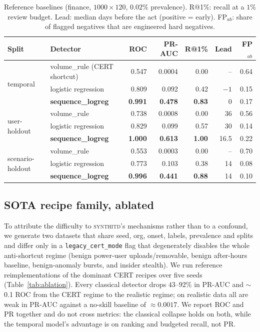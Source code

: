 \documentclass[11pt]{article}
\newcommand{\sys}{\textsc{synthitd}}
\newcommand{\code}[1]{\texttt{\small #1}}
\begin{document}
\begin{table}[t]
\centering
\caption{Reference baselines (finance, $1000\times120$, $0.02\%$ prevalence).
R@1\%: recall at a $1\%$ review budget. Lead: median days before the act (positive =
early). FP$_{ab}$: share of flagged negatives that are engineered hard negatives.}
\label{tab:baselines}
\small
\setlength{\tabcolsep}{4.5pt}
\begin{tabular}{llrrrrr}
\toprule
Split & Detector & ROC & PR-AUC & R@1\% & Lead & FP$_{ab}$ \\
\midrule
\multirow{3}{*}{temporal}
 & volume\_rule (CERT shortcut) & 0.547 & 0.0004 & 0.00 & -- & 0.64 \\
 & logistic regression          & 0.809 & 0.092 & 0.42 & $-1$ & 0.15 \\
 & \textbf{sequence\_logreg}    & \textbf{0.991} & \textbf{0.478} & \textbf{0.83} & $0$ & 0.17 \\
\midrule
\multirow{3}{*}{user-holdout}
 & volume\_rule                 & 0.738 & 0.0008 & 0.00 & 36 & 0.56 \\
 & logistic regression          & 0.829 & 0.099 & 0.57 & 30 & 0.14 \\
 & \textbf{sequence\_logreg}    & \textbf{1.000} & \textbf{0.613} & \textbf{1.00} & 16.5 & 0.22 \\
\midrule
\multirow{3}{*}{scenario-holdout}
 & volume\_rule                 & 0.553 & 0.0003 & 0.00 & -- & 0.70 \\
 & logistic regression          & 0.773 & 0.103 & 0.38 & 14 & 0.08 \\
 & \textbf{sequence\_logreg}    & \textbf{0.996} & \textbf{0.441} & \textbf{0.88} & 14 & 0.10 \\
\bottomrule
\end{tabular}
\end{table}

\subsection{SOTA recipe family, ablated}
To attribute the difficulty to \sys{}'s mechanisms rather than to a confound, we
generate two datasets that share seed, org, onset, labels, prevalence and splits and
differ only in a \code{legacy\_cert\_mode} flag that degenerately disables the whole
anti-shortcut regime (benign power-user uploads/removable, benign after-hours baseline,
benign-anomaly bursts, and insider stealth). We run reference reimplementations of the
dominant CERT recipes over five seeds (Table~\ref{tab:ablation}). Every classical
detector drops $43$--$92\%$ in PR-AUC and $\sim$0.1 ROC from the CERT regime to the
realistic regime; on realistic data all are weak in PR-AUC against a no-skill baseline
of $\approx0.0017$. We report ROC and PR together and do not cross metrics: the
classical collapse holds on both, while the temporal model's advantage is on ranking
and budgeted recall, not PR.
\end{document}
